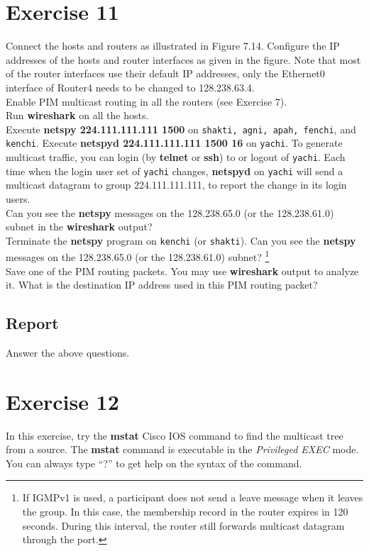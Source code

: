 \documentclass[10pt,a4paper]{article}
\numberwithin{equation}{section}
\numberwithin{figure}{section}
\numberwithin{table}{section}
\begin{document}
    \section{ Exercise 11}
    Connect the hosts and routers as illustrated in Figure 7.14.
    Configure the IP addresses of the hosts and router interfaces as given in the figure.
    Note that most of the router interfaces use their default IP addresses, only the Ethernet0 interface of Router4 needs to be changed to 128.238.63.4. \\
    Enable PIM multicast routing in all the routers (see Exercise 7). \\
    Run \textbf{wireshark} on all the hosts. \\
    Execute \textbf{netspy 224.111.111.111 1500} on \texttt{shakti, agni, apah, fenchi}, and \texttt{kenchi}.
    Execute \textbf{netspyd 224.111.111.111 1500 16} on \texttt{yachi}.
    To generate multicast traffic, you can login (by \textbf{telnet} or \textbf{ssh}) to or logout of \texttt{yachi}.
    Each time when the login user set of \texttt{yachi} changes, \textbf{netspyd} on \texttt{yachi} will send a multicast datagram to group 224.111.111.111, to report the change in its login users. \\
    Can you see the \textbf{netspy} messages on the 128.238.65.0 (or the 128.238.61.0) subnet in the \textbf{wireshark} output? \\
    Terminate the \textbf{netspy} program on \texttt{kenchi} (or \texttt{shakti}).
    Can you see the \textbf{netspy} messages on the 128.238.65.0 (or the 128.238.61.0) subnet?
    \footnote{If IGMPv1 is used, a participant does not send a leave message when it leaves the group.
    In this case, the membership record in the router expires in 120 seconds.
    During this interval, the router still forwards multicast datagram through the port.} \\
    Save one of the PIM routing packets.
    You may use \textbf{wireshark} output to analyze it.
    What is the destination IP address used in this PIM routing packet?
    \subsection*{Report}
    Answer the above questions.

    \section{ Exercise 12}
    In this exercise, try the \textbf{mstat} Cisco IOS command to find the multicast tree from a source.
    The \textbf{mstat} command is executable in the \textit{Privileged EXEC} mode.
    You can always type “?” to get help on the syntax of the command.
\end{document}
